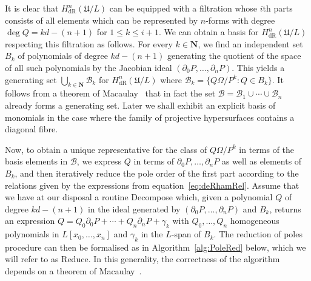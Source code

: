 \documentclass[a4paper,11pt]{article}
\numberwithin{equation}{section}
\newcommand{\NN}{\mathbf{N}} %
\providecommand{\HdR}{H_{\text{dR}}}    %
\providecommand{\cB}{\mathcal{B}} %
\theoremstyle{definition}
\begin{document}
It is clear that $\HdR^{n}(\mathfrak{U}/L)$ can be equipped with a 
filtration whose $i$th parts consists of all elements which can be 
represented by $n$-forms with degree $\deg Q = kd - (n + 1)$ for 
$1 \leq k \leq i + 1$. We can obtain a basis for $\HdR^{n}(\mathfrak{U}/L)$ 
respecting this filtration as follows.  For every $k \in \NN$, we find 
an independent set $B_k$ of polynomials of degree $kd-(n+1)$ generating 
the quotient of the space of all such polynomials by the Jacobian ideal 
$(\partial_0 P, \dotsc, \partial_n P)$.  This yields a generating set 
$\bigcup_{k \in \NN} \cB_k$ for $\HdR^n(\mathfrak{U}/L)$ where 
$\cB_k = \{Q \Omega / P^k : Q \in B_k\}$.  It follows from a theorem of 
Macaulay~\citep[\S 4, (4.11)]{Griffiths1969} that in fact the set 
$\cB = \cB_1 \cup \dotsb \cup \cB_n$ already forms a generating set.  
Later we shall exhibit an explicit basis of monomials in the case where 
the family of projective hypersurfaces contains a diagonal fibre.

Now, to obtain a unique representative for the class of $Q \Omega / P^k$ 
in terms of the basis elements in $\cB$, we express $Q$ in terms of 
$\partial_0 P, \dotsc, \partial_n P$ as well as elements of $B_k$, and 
then iteratively reduce the pole order of the first part according to 
the relations given by the expressions from equation~\eqref{eq:deRhamRel}. 
Assume that we have at our disposal a routine {\sc Decompose} which, 
given a polynomial $Q$ of degree $kd - (n+1)$ in the ideal generated by 
$(\partial_0 P, \dotsc, \partial_n P)$ and $B_k$, returns an expression 
$Q = Q_0 \partial_0 P + \dotsb + Q_n \partial_n P + \gamma_k$ with 
$Q_0, \dotsc, Q_n$ homogeneous polynomials in $L[x_0, \dotsc, x_n]$ and 
$\gamma_k$ in the $L$-span of $B_k$.  The reduction of poles procedure can 
then be formalised as in Algorithm~\ref{alg:PoleRed} below, which we will 
refer to as {\sc Reduce}.  In this generality, the correctness of the 
algorithm depends on a theorem of Macaulay~\citep[\S 4, (4.11)]{Griffiths1969}.
\end{document}
